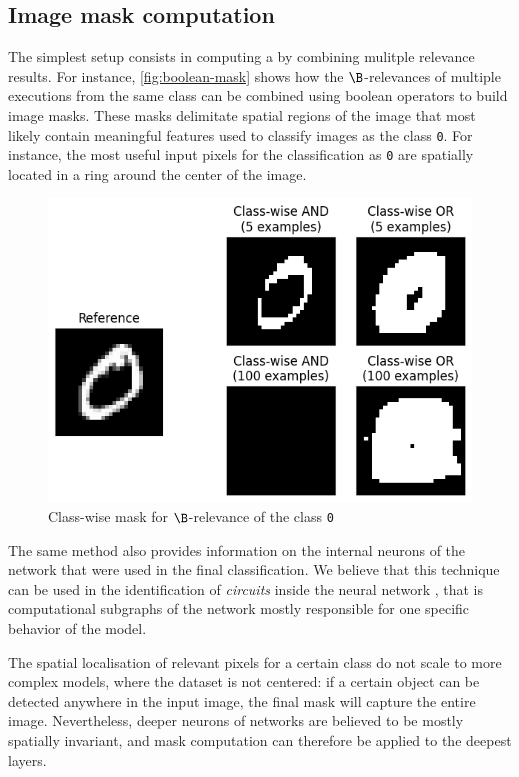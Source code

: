 \documentclass[twocolumn]{../cs-classes/cs-classes}
\newcommand*{\1}{\digitsbb{1}}
\newcommand*{\0}{\digitsbb{0}}
\begin{document}
\subsection{Image mask computation}
The simplest setup consists in computing a  by combining mulitple relevance results. For instance, \autoref{fig:boolean-mask} shows how the $\B$-relevances of multiple executions from the same class can be combined using boolean operators to build image masks. These masks delimitate spatial regions of the image that most likely contain meaningful features used to classify images as the class \texttt{0}. For instance, the most useful input pixels for the classification as \texttt{0} are spatially located in a ring around the center of the image.
\begin{figure}[H]
    \centering
    \includegraphics[width=.9\linewidth]{boolean-mask.png}
    \caption{Class-wise mask for $\B$-relevance of the class \texttt{0}}
    \label{fig:boolean-mask}
\end{figure}
The same method also provides information on the internal neurons of the network that were used in the final classification. We believe that this technique can be used in the identification of \emph{circuits} inside the neural network \cite{circuits}, that is computational subgraphs of the network mostly responsible for one specific behavior of the model.

The spatial localisation of relevant pixels for a certain class do not scale to more complex models, where the dataset is not centered: if a certain object can be detected anywhere in the input image, the final mask will capture the entire image. Nevertheless, deeper neurons of networks are believed to be mostly spatially invariant, and mask computation can therefore be applied to the deepest layers.
\end{document}
